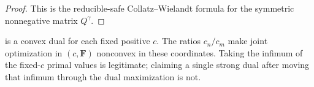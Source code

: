 \begin{proof}
This is the reducible-safe Collatz--Wielandt formula for the symmetric
nonnegative matrix \(Q^\gamma\).
\end{proof}

\begin{remark}
 is a convex dual for each fixed positive
\(c\).  The ratios \(c_n/c_m\) make joint optimization in
\((c,\boldsymbol F)\) nonconvex in these coordinates.  Taking the
infimum of the fixed-\(c\) primal values is legitimate; claiming a single
strong dual after moving that infimum through the dual maximization is
not.
\end{remark}
